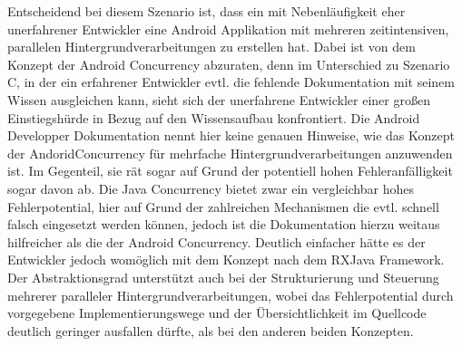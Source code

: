 \documentclass[12pt,oneside,a4paper,bibtotoc,liststotoc]{scrreprt}
\begin{document}
Entscheidend bei diesem Szenario ist, dass ein mit Nebenläufigkeit eher unerfahrener Entwickler eine Android Applikation mit mehreren zeitintensiven, parallelen Hintergrundverarbeitungen zu erstellen hat. Dabei ist von dem Konzept der Android Concurrency abzuraten, denn im Unterschied zu Szenario C, in der ein erfahrener Entwickler evtl. die fehlende Dokumentation mit seinem Wissen ausgleichen kann, sieht sich der unerfahrene Entwickler einer großen Einstiegshürde in Bezug auf den Wissensaufbau konfrontiert. Die Android Developper Dokumentation nennt hier keine genauen Hinweise, wie das Konzept der AndoridConcurrency für mehrfache Hintergrundverarbeitungen anzuwenden ist. Im Gegenteil, sie rät sogar auf Grund der potentiell hohen Fehleranfälligkeit sogar davon ab. Die Java Concurrency bietet zwar ein vergleichbar hohes Fehlerpotential, hier auf Grund der zahlreichen Mechanismen die evtl. schnell falsch eingesetzt werden können, jedoch ist die Dokumentation hierzu weitaus hilfreicher als die der Android Concurrency. Deutlich einfacher hätte es der Entwickler jedoch womöglich mit dem Konzept nach dem RXJava Framework. Der Abstraktionsgrad unterstützt auch bei der Strukturierung und Steuerung mehrerer paralleler Hintergrundverarbeitungen, wobei das Fehlerpotential durch vorgegebene Implementierungswege und der Übersichtlichkeit im Quellcode deutlich geringer ausfallen dürfte, als bei den anderen beiden Konzepten.
\end{document}
